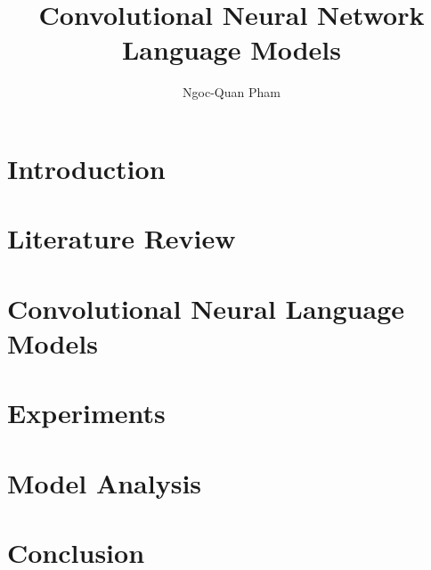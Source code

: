 \documentclass[12pt]{report}
\begin{document}
\title{Convolutional Neural Network Language Models}
\author{Ngoc-Quan Pham}

\beforepreface
%
%
\afterpreface


\chapter{Introduction}
\label{c:intro}


\chapter{Literature Review}
\label{c:review}



\chapter{Convolutional Neural Language Models}
\label{c:cnn}


\chapter{Experiments}
\label{c:exp}


\chapter{Model Analysis}
\label{c:analysis}


\chapter{Conclusion}
\label{c:conc}

\end{document}
